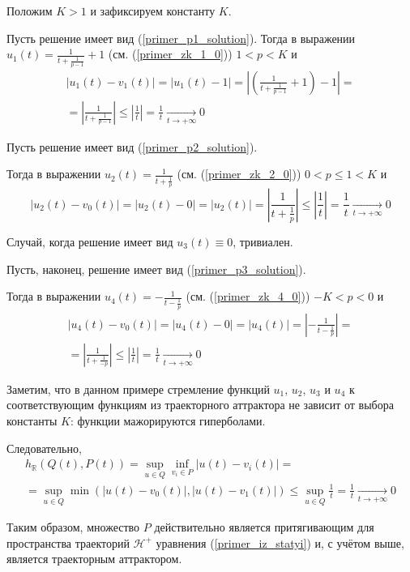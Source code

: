Положим $K>1$ и зафиксируем константу $K$.

Пусть решение имеет вид (\ref{primer_p1_solution}).
Тогда в выражении $u_1(t)=\frac{1}{t+\frac{1}{p-1}}+1$  (см. (\ref{primer_zk_1_0})) $1<p<K$ и
\begin{multline}
	|u_1(t) - v_1(t)| =
	|u_1(t) - 1| =
	\left|\left(\frac{1}{t+\frac{1}{p-1}}+1\right) -1\right| =
	\\ =
	\left|\frac{1}{t+\frac{1}{p-1}}\right| \leq
	\left|\frac{1}{t}\right| =
	\frac{1}{t}
	\xrightarrow[t\to+\infty]{}0
\end{multline}

Пусть решение имеет вид (\ref{primer_p2_solution}).

Тогда в выражении $u_2(t)=\frac{1}{t+\frac{1}{p}}$  (см. (\ref{primer_zk_2_0})) $0 < p \leq 1 < K$ и
\begin{equation}
	|u_2(t) - v_0(t)| =
	|u_2(t) - 0| =
	|u_2(t)| =
	\left| \frac{1}{t+\frac{1}{p}} \right| \leq
	\left|\frac{1}{t}\right| =
	\frac{1}{t}
	\xrightarrow[t\to+\infty]{}0
\end{equation}

Случай, когда решение имеет вид $u_3(t) \equiv 0$, тривиален.

Пусть, наконец, решение имеет вид (\ref{primer_p3_solution}).

Тогда в выражении $u_4(t)=-\frac{1}{t-\frac{1}{p}}$  (см. (\ref{primer_zk_4_0})) $-K < p < 0$ и
\begin{multline}
	|u_4(t) - v_0(t)| =
	|u_4(t) - 0| =
	|u_4(t)| =
	\left| -\frac{1}{t-\frac{1}{p}} \right| =
	\\ =
	\left| \frac{1}{t+\frac{1}{-p}} \right| \leq
	\left|\frac{1}{t}\right| =
	\frac{1}{t}
	\xrightarrow[t\to+\infty]{}0
\end{multline}

Заметим, что в данном примере стремление функций $u_1$, $u_2$, $u_3$ и $u_4$
к соответствующим функциям из траекторного аттрактора не зависит от выбора константы $K$: функции мажорируются гиперболами.

Следовательно,
\begin{multline}
	h_{\mathbb{R}}(Q(t),P(t)) =
	\sup_{u\in Q} \inf_{v_i \in P} |u(t) - v_i(t)| =
	\\ =
	\sup_{u\in Q} \min(|u(t) - v_0(t)|,|u(t) - v_1(t)|) \leq
	\sup_{u\in Q} \frac{1}{t} =
	\frac{1}{t}
	\xrightarrow[t\to+\infty]{}0
\end{multline}

Таким образом, множество $P$ действительно является притягивающим для пространства траекторий $\mathcal{H}^+$ уравнения (\ref{primer_iz_statyi}) и, с учётом выше, является траекторным аттрактором.

